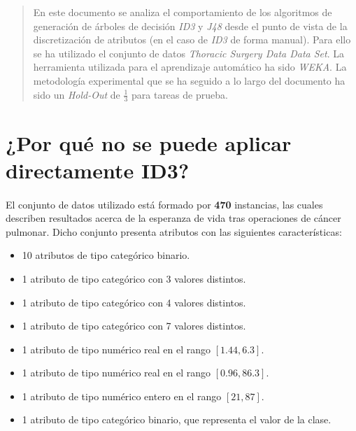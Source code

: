 \documentclass[10pt, a4paper,spanish]{article}
\begin{document}
	\maketitle %

	\thispagestyle{fancy} %



	\begin{abstract}
		\noindent En este documento se analiza el comportamiento de los algoritmos de generación de árboles de decisión \emph{ID3} y \emph{J48} desde el punto de vista de la discretización de atributos (en el caso de \emph{ID3} de forma manual). Para ello se ha utilizado el conjunto de datos \emph{Thoracic Surgery Data Data Set}\cite{dataset:thoracic}. La herramienta utilizada para el aprendizaje automático ha sido \emph{WEKA}\cite{tool:weka}. La metodología experimental que se ha seguido a lo largo del documento ha sido un \emph{Hold-Out} de $\frac{1}{3}$ para tareas de prueba.
	\end{abstract}



	\section{¿Por qué no se puede aplicar directamente ID3?}
	\label{sec:1}

		\paragraph{}
		El conjunto de datos utilizado\cite{dataset:thoracic} está formado por \textbf{470} instancias, las cuales describen resultados acerca de la esperanza de vida tras operaciones de cáncer pulmonar. Dicho conjunto presenta atributos con las siguientes características:
		\begin{itemize}
			\setlength\itemsep{0em}
			\item 10 atributos de tipo categórico binario.
			\item 1 atributo de tipo categórico con 3 valores distintos.
			\item 1 atributo de tipo categórico con 4 valores distintos.
			\item 1 atributo de tipo categórico con 7 valores distintos.
			\item 1 atributo de tipo numérico real en el rango $[1.44, 6.3]$.
			\item 1 atributo de tipo numérico real en el rango $[0.96, 86.3]$.
			\item 1 atributo de tipo numérico entero en el rango $[21, 87]$.
			\item 1 atributo de tipo categórico binario, que representa el valor de la clase.
		\end{itemize}
\end{document}
